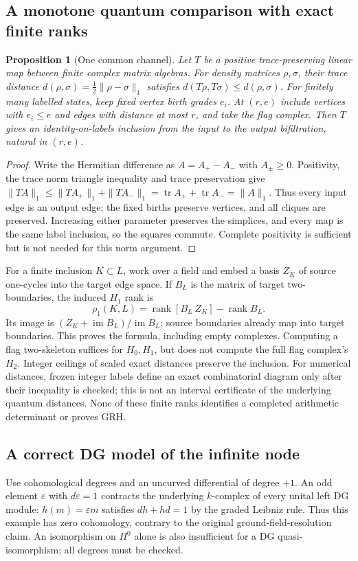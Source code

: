 \documentclass[11pt]{article}
\newtheorem{proposition}[theorem]{Proposition}
\theoremstyle{definition}\newtheorem{definition}[theorem]{Definition}
\theoremstyle{remark}\newtheorem{remark}[theorem]{Remark}
\begin{document}
\subsection{A monotone quantum comparison with exact finite ranks}
\begin{proposition}[One common channel]\label{thm:channel-filtration}
Let $T$ be a positive trace-preserving linear map between finite complex
matrix algebras. For density matrices $\rho,\sigma$, their trace distance
$d(\rho,\sigma)=\tfrac12\|\rho-\sigma\|_1$ satisfies
$d(T\rho,T\sigma)\le d(\rho,\sigma)$.
For finitely many labelled states, keep fixed vertex birth grades $e_i$.
At $(r,e)$ include vertices with $e_i\le e$ and edges with distance at most
$r$, and take the flag complex. Then $T$ gives an identity-on-labels inclusion
from the input to the output bifiltration, natural in $(r,e)$.
\end{proposition}
\begin{proof}
Write the Hermitian difference as $A=A_+-A_-$ with $A_\pm\ge0$.
Positivity, the trace norm triangle inequality and trace preservation give
$\|T A\|_1\le\|T A_+\|_1+\|T A_-\|_1
=\operatorname{tr}A_++\operatorname{tr}A_-=\|A\|_1$.
Thus every input edge is an output edge; the fixed births preserve vertices,
and all cliques are preserved. Increasing either parameter preserves the
simplices, and every map is the same label inclusion, so the squares commute.
Complete positivity is sufficient but is not needed for this norm argument.
\end{proof}
For a finite inclusion $K\subset L$, work over a field and embed a basis
$Z_K$ of source one-cycles into the target edge space. If $B_L$ is the
matrix of target two-boundaries, the induced $H_1$ rank is
\[
 \rho_1(K,L)=\operatorname{rank}[B_L\ Z_K]-\operatorname{rank}B_L.
\]
Its image is $(Z_K+\operatorname{im}B_L)/\operatorname{im}B_L$; source
boundaries already map into target boundaries. This proves the formula,
including empty complexes. Computing a flag two-skeleton suffices for
$H_0,H_1$, but does not compute the full flag complex's $H_2$.
Integer ceilings of scaled exact distances preserve the inclusion.
For numerical distances, frozen integer labels define an exact combinatorial
diagram only after their inequality is checked; this is not an interval
certificate of the underlying quantum distances. None of these finite ranks
identifies a completed arithmetic determinant or proves GRH.

\subsection{A correct DG model of the infinite node}
Use cohomological degrees and an uncurved differential of degree $+1$.
An odd element $\varepsilon$ with $d\varepsilon=1$ contracts the underlying $k$-complex of every unital
left DG module: $h(m)=\varepsilon m$ satisfies $dh+hd=1$ by the graded
Leibniz rule. Thus this example has zero cohomology, contrary to the
original ground-field-resolution claim. An isomorphism on $H^0$ alone is
also insufficient for a DG quasi-isomorphism; all degrees must be checked.
\end{document}
